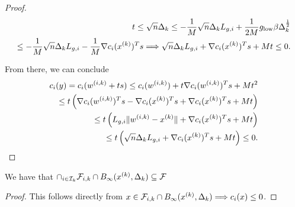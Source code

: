 \begin{proof}
\begin{align*}
t 
\le \sqrt{n} \Delta_k 
\le -\frac 1 M \sqrt{n}\Delta_k {L_{g, i}} + \frac 1 {2M} g_{\text{low}} \beta \Delta_k^{\frac 1 2} \\
\le -\frac 1 M \sqrt{n}\Delta_k {L_{g, i}} -\frac 1 M \nabla c_i({x^{(k)}})^Ts 
\Longrightarrow \sqrt{n}\Delta_k {L_{g, i}} + \nabla c_i({x^{(k)}})^Ts + M t \le 0.
\end{align*}

From there, we can conclude
\begin{align*}
c_i(y) = c_i({w^{(i, k)}} + ts) \le c_i({w^{(i, k)}}) + t\nabla c_i({w^{(i, k)}})^Ts + M t^2 \\
\le t \left(\nabla c_i({w^{(i, k)}})^Ts - \nabla c_i({x^{(k)}})^Ts + \nabla c_i({x^{(k)}})^Ts + M t\right) \\
\le t \left({L_{g, i}}\|{w^{(i, k)}} - {x^{(k)}}\| + \nabla c_i({x^{(k)}})^Ts + M t\right) \\
\le t \left(\sqrt{n}\Delta_k {L_{g, i}} + \nabla c_i({x^{(k)}})^Ts + M t\right) \le 0.
\end{align*}



\end{proof}



\begin{theorem}
We have that $\cap_{i \in {\mathcal I_{k}}} {\mathcal F_{i, k}} \cap B_{\infty}({x^{(k)}}, \Delta_k) \subseteq {\mathcal F}$ 
\end{theorem}

\begin{proof}
This follows directly from $x \in {\mathcal F_{i, k}} \cap B_{\infty}({x^{(k)}}, \Delta_k) \Longrightarrow c_i(x) \le 0$.
\end{proof}



